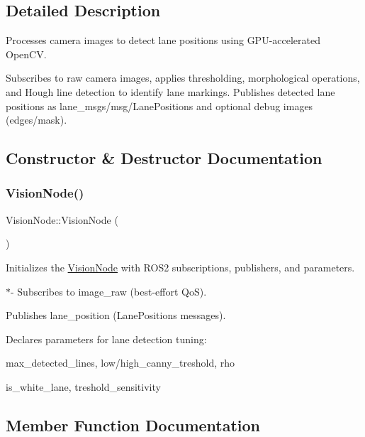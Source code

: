 \subsection{Detailed Description}
Processes camera images to detect lane positions using G\+P\+U-\/accelerated Open\+CV. 

Subscribes to raw camera images, applies thresholding, morphological operations, and Hough line detection to identify lane markings. Publishes detected lane positions as {\ttfamily lane\+\_\+msgs/msg/\+Lane\+Positions} and optional debug images (edges/mask). 

\subsection{Constructor \& Destructor Documentation}
\mbox{\label{classVisionNode_ac084d7f3ca8b99239b9215eacae6a3b3}} 
\subsubsection{\texorpdfstring{Vision\+Node()}{VisionNode()}}
{\footnotesize\ttfamily Vision\+Node\+::\+Vision\+Node (\begin{DoxyParamCaption}{ }\end{DoxyParamCaption})}



Initializes the \hyperlink{classVisionNode}{Vision\+Node} with R\+O\+S2 subscriptions, publishers, and parameters. 

$\ast$-\/ Subscribes to {\ttfamily image\+\_\+raw} (best-\/effort QoS).
\begin{DoxyItemize}
\item Publishes {\ttfamily lane\+\_\+position} (Lane\+Positions messages).
\item Declares parameters for lane detection tuning\+:
\begin{DoxyItemize}
\item {\ttfamily max\+\_\+detected\+\_\+lines}, {\ttfamily low/high\+\_\+canny\+\_\+treshold}, {\ttfamily rho}
\item {\ttfamily is\+\_\+white\+\_\+lane}, {\ttfamily treshold\+\_\+sensitivity} 
\end{DoxyItemize}
\end{DoxyItemize}

\subsection{Member Function Documentation}
\mbox{\label{classVisionNode_ace70a008db68efbf89cc43e485e06744}} 

